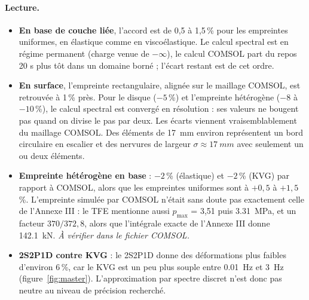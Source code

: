 \paragraph{Lecture.}
\begin{itemize}[nosep]
\item \textbf{En base de couche liée}, l'accord est de 0,5 à 1,5\,\% pour les empreintes uniformes,
      en élastique comme en viscoélastique. Le calcul spectral est en régime permanent (charge
      venue de $-\infty$), le calcul COMSOL part du repos 20 s plus tôt dans un domaine borné ;
      l'écart restant est de cet ordre.
\item \textbf{En surface}, l'empreinte rectangulaire, alignée sur le maillage COMSOL, est
      retrouvée à 1\,\% près. Pour le disque ($-5$\,\%) et l'empreinte hétérogène ($-8$ à
      $-10$\,\%), le calcul spectral est convergé en résolution : ses valeurs ne bougent pas quand on
      divise le pas par deux. Les écarts viennent vraisemblablement du maillage COMSOL. Des éléments
      de \SI{17}{mm} environ représentent un bord circulaire en escalier et des nervures de largeur
      $\sigma\approx\SI{17}{mm}$ avec seulement un ou deux éléments.
\item \textbf{Empreinte hétérogène en base} : $-2$\,\% (élastique) et $-2$\,\% (KVG) par rapport à
      COMSOL, alors que les empreintes uniformes sont à $+0{,}5$ à $+1{,}5$\,\%. L'empreinte simulée
      par COMSOL n'était sans doute pas exactement celle de l'Annexe III : le TFE mentionne aussi
      $p_{\max}$ = 3,51 puis \SI{3.31}{MPa}, et un facteur $370/372{,}8$, alors que l'intégrale
      exacte de l'Annexe III donne \SI{142.1}{kN}. \emph{À vérifier dans le fichier COMSOL.}
\item \textbf{2S2P1D contre KVG} : le 2S2P1D donne des déformations plus faibles d'environ 6\,\%,
      car le KVG est un peu plus souple entre \SI{0.01}{Hz} et \SI{3}{Hz} (figure~\ref{fig:master}).
      L'approximation par spectre discret n'est donc pas neutre au niveau de précision recherché.
\end{itemize}

